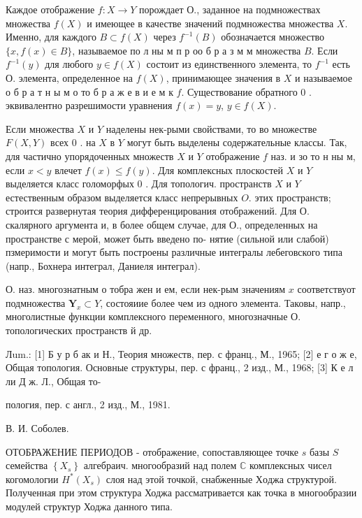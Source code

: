 \documentclass[10pt]{article}
\begin{document}
Каждое отображение $f: X \rightarrow Y$ порождает О., заданное на подмножествах множества $f(X)$ и имеющее в качестве значений подмножества множества $X$. Именно, для каждого $B \subset f(X)$ через $f^{-1}(B)$ обозначается множество $\{x, f(x) \in B\}$, называемое по л ны м п р оо б р а з м м множества $B$. Если $f^{-1}(y)$ для любого $y \in f(X)$ состоит из единственного элемента, то $f^{-1}$ есть $О$. элемента, определенное на $f(X)$, принимающее значения в $X$ и называемое о $б$ р а т н ы м о то б р а ж е в и е м к $f$. Существование обратного 0 . эквивалентно разрешимости уравнения $f(x)=y$, $y \in f(X)$.



Если множества $X$ и $Y$ наделены нек-рыми свойствами, то во множестве $F(X, Y)$ всех 0 . на $X$ в $Y$ могут быть выделены содержательные классы. Так, для частично упорядоченных множеств $X$ и $Y$ отображение $f$ наз. и зо то н ны м, если $x<y$ влечет $f(x) \leqslant f(y)$. Для комплексных плоскостей $X$ и $Y$ выделяется класс голоморфых 0 . Для топологич. пространств $X$ и $Y$ естественным образом выделяется класс непрерывных $O$. этих пространств; строится развернутая теория дифференцирования отображений. Для О. скалярного аргумента и, в более общем случае, для О., определенных на пространстве с мерой, может быть введено по- нятие (сильной или слабой) пзмеримости и могут быть построены различные интегралы лебеговского типа (напр., Бохнера интеграл, Даниеля интеграл).



О. наз. многознатным о тобра жен и ем, если нек-рым значениям $x$ соответствуот подмножества $\boldsymbol{Y}_{x} \subset Y$, состояиие более чем из одного элемента. Таковы, напр., многолистные функции комплексного переменного, многозначные О. топологических пространств й др.



Лum.: [1] Б у р б ак и Н., Теория множеств, пер. с франц., М., 1965; [2] е г о ж е, Общая топология. Основные структуры, пер. с франц., 2 изд., М., 1968; [3] К е л ли Д ж. Л., Общая то-

пология, пер. с англ., 2 изд., М., 1981.

В. И. Соболев.



ОТОБРАЖЕНИЕ ПЕРИОДОВ - отображение, сопоставляющее точке $s$ базы $S$ семейства $\left\{X_{s}\right\}$ алгебраич. многообразий над полем $\mathbb{C}$ комплексных чисел когомологии $H^{*}\left(X_{s}\right)$ слоя над этой точкой, снабженные $Х о д ж а$ структурой. Полученная при этом структура Ходжа рассматривается как точка в многообразии модулей структур Ходжа данного типа.
\end{document}

